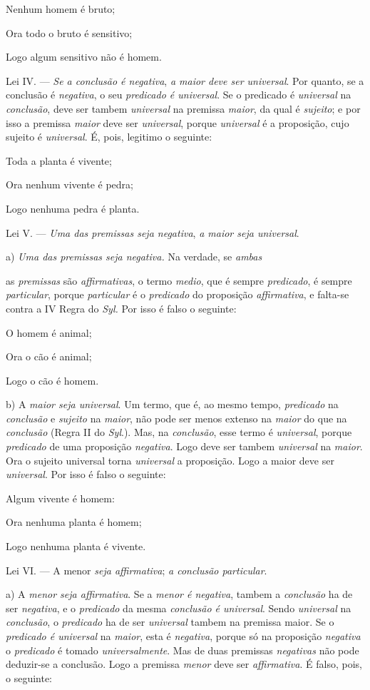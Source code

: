 Nenhum homem é bruto;

Ora todo o bruto é sensitivo;

Logo algum sensitivo não é homem.

Lei IV. --- \emph{Se a conclusão é negativa}, \emph{a maior deve ser universal}. Por quanto, se a conclusão é \emph{negativa}, o seu \emph{predicado é universal}. Se o predicado é \emph{universal} na \emph{conclusão}, deve ser tambem \emph{universal} na premissa \emph{maior}, da qual é \emph{sujeito}; e por isso a premissa \emph{maior} deve ser \emph{universal}, porque \emph{universal} é a proposição, cujo sujeito é \emph{universal}. É, pois, legitimo o seguinte:

Toda a planta é vivente;

Ora nenhum vivente é pedra;

Logo nenhuma pedra é planta.

Lei V. --- \emph{Uma das premissas seja negativa}, \emph{a maior seja universal}.

a) \emph{Uma das premissas seja negativa.} Na verdade, se \emph{ambas}

as \emph{premissas} são \emph{affirmativas}, o termo \emph{medio}, que é sempre \emph{predicado}, é sempre \emph{particular}, porque \emph{particular} é o \emph{predicado} do proposição \emph{affirmativa}, e falta-se contra a IV Regra do \emph{Syl.} Por isso é falso o seguinte:

O homem é animal;

Ora o cão é animal;

Logo o cão é homem.

b) A \emph{maior seja universal}. Um termo, que é, ao mesmo tempo, \emph{predicado} na \emph{conclusão} e \emph{sujeito} na \emph{maior}, não pode ser menos extenso na \emph{maior} do que na \emph{conclusão} (Regra II do \emph{Syl}.). Mas, na \emph{conclusão}, esse termo é \emph{universal}, porque \emph{predicado} de uma proposição \emph{negativa}. Logo deve ser tambem \emph{universal} na \emph{maior}. Ora o sujeito universal torna \emph{universal} a proposição. Logo a maior deve ser \emph{universal}. Por isso é falso o seguinte:

Algum vivente é homem:

Ora nenhuma planta é homem;

Logo nenhuma planta é vivente.

Lei VI. --- A menor \emph{seja affirmativa}; \emph{a conclusão particular}.

a) A \emph{menor seja affirmativa}. Se a \emph{menor é negativa}, tambem a \emph{conclusão} ha de ser \emph{negativa}, e o \emph{predicado} da mesma \emph{conclusão é universal}. Sendo \emph{universal} na \emph{conclusão}, o \emph{predicado} ha de ser \emph{universal} tambem na premissa maior. Se o \emph{predicado é universal} na \emph{maior}, esta é \emph{negativa}, porque só na proposição \emph{negativa} o \emph{predicado} é tomado \emph{universalmente}. Mas de duas premissas \emph{negativas} não pode deduzir-se a conclusão. Logo a premissa \emph{menor} deve ser \emph{affirmativa}. É falso, pois, o seguinte:

